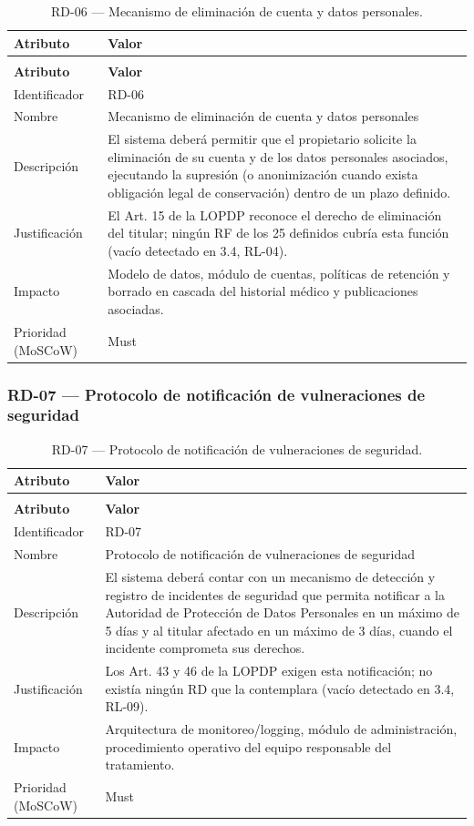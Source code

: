 \documentclass[journal,onecolumn]{IEEEtran}
\makeatletter
\newenvironment{atributos}[2]{%
	\small
	\begin{longtable}{@{}>{\raggedright\arraybackslash}p{4.2cm} >{\raggedright\arraybackslash}p{11.2cm}@{}}
		\caption{#2}\label{tab:#1}\\
		\toprule
		\textbf{Atributo} & \textbf{Valor} \\
		\midrule
		\endfirsthead
		\multicolumn{2}{@{}l}{\small\itshape (continuación)}\\
		\toprule
		\textbf{Atributo} & \textbf{Valor} \\
		\midrule
		\endhead
		\bottomrule
		\endlastfoot
	}{%
	\end{longtable}
	\normalsize
}
\makeatother
\begin{document}
	\begin{atributos}{RD-06}{RD-06 --- Mecanismo de eliminación de cuenta y datos personales.}
		Identificador & RD-06 \\
		Nombre & Mecanismo de eliminación de cuenta y datos personales \\
		Descripción & El sistema deberá permitir que el propietario solicite la eliminación de su cuenta y de los datos personales asociados, ejecutando la supresión (o anonimización cuando exista obligación legal de conservación) dentro de un plazo definido. \\
		Justificación & El Art. 15 de la LOPDP reconoce el derecho de eliminación del titular; ningún RF de los 25 definidos cubría esta función (vacío detectado en 3.4, RL-04). \\
		Impacto & Modelo de datos, módulo de cuentas, políticas de retención y borrado en cascada del historial médico y publicaciones asociadas. \\
		Prioridad (MoSCoW) & Must \\
	\end{atributos}
	
	\subsubsection{RD-07 --- Protocolo de notificación de vulneraciones de seguridad}
	
	\begin{atributos}{RD-07}{RD-07 --- Protocolo de notificación de vulneraciones de seguridad.}
		Identificador & RD-07 \\
		Nombre & Protocolo de notificación de vulneraciones de seguridad \\
		Descripción & El sistema deberá contar con un mecanismo de detección y registro de incidentes de seguridad que permita notificar a la Autoridad de Protección de Datos Personales en un máximo de 5 días y al titular afectado en un máximo de 3 días, cuando el incidente comprometa sus derechos. \\
		Justificación & Los Art. 43 y 46 de la LOPDP exigen esta notificación; no existía ningún RD que la contemplara (vacío detectado en 3.4, RL-09). \\
		Impacto & Arquitectura de monitoreo/logging, módulo de administración, procedimiento operativo del equipo responsable del tratamiento. \\
		Prioridad (MoSCoW) & Must \\
	\end{atributos}
	
\end{document}
